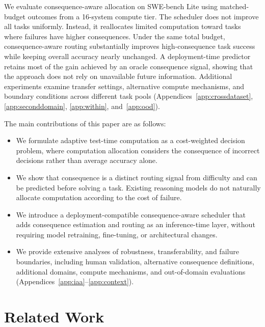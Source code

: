 \documentclass{article}
\begin{document}
We evaluate consequence-aware allocation on SWE-bench Lite using
matched-budget outcomes from a 16-system compute tier. The scheduler
does not improve all tasks uniformly. Instead, it reallocates limited
computation toward tasks where failures have higher consequences. Under
the same total budget, consequence-aware routing substantially improves
high-consequence task success while keeping overall accuracy nearly
unchanged. A deployment-time predictor retains most of the gain achieved
by an oracle consequence signal, showing that the approach does not rely
on unavailable future information. Additional experiments examine
transfer settings, alternative compute mechanisms, and boundary
conditions across different task pools
(Appendices~\ref{app:crossdataset}, \ref{app:seconddomain},
\ref{app:within}, and~\ref{app:ood}).

The main contributions of this paper are as follows:

\begin{itemize}

\item We formulate adaptive test-time computation as a cost-weighted
decision problem, where computation allocation considers the consequence
of incorrect decisions rather than average accuracy alone.

\item We show that consequence is a distinct routing signal from
difficulty and can be predicted before solving a task. Existing
reasoning models do not naturally allocate computation according to the
cost of failure.

\item We introduce a deployment-compatible consequence-aware scheduler
that adds consequence estimation and routing as an inference-time layer,
without requiring model retraining, fine-tuning, or architectural
changes.

\item We provide extensive analyses of robustness, transferability, and
failure boundaries, including human validation, alternative consequence
definitions, additional domains, compute mechanisms, and out-of-domain
evaluations
(Appendices~\ref{app:iaa}--\ref{app:context}).

\end{itemize}

\section{Related Work}
\end{document}
